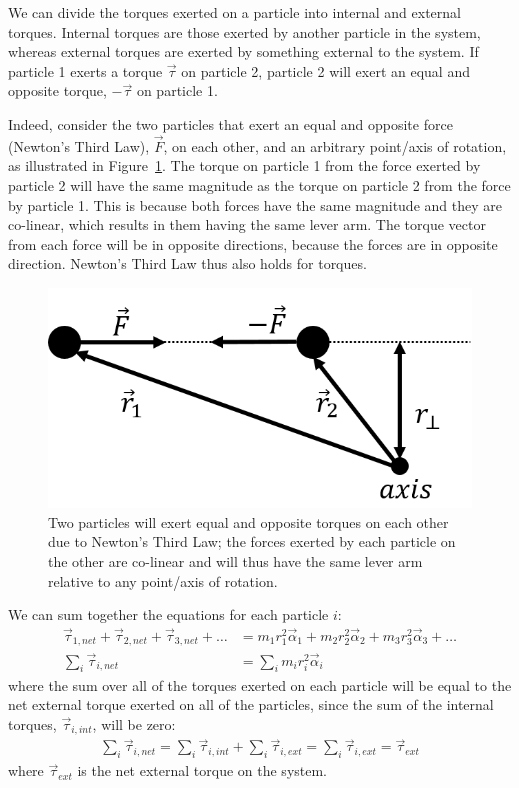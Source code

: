 We can divide the torques exerted on a particle into internal and external torques. Internal torques are those exerted by another particle in the system, whereas external torques are exerted by something external to the system. If particle 1 exerts a torque $\vec\tau$ on particle 2, particle 2 will exert an equal and opposite torque, $-\vec\tau$ on particle 1.

Indeed, consider the two particles that exert an equal and opposite force (Newton's Third Law), $\vec F$, on each other, and an arbitrary point/axis of rotation, as illustrated in Figure~\ref{fig:rotationaldynamics:internaltau}. The torque on particle 1 from the force exerted by particle 2 will have the same magnitude as the torque on particle 2 from the force by particle 1. This is because both forces have the same magnitude and they are co-linear, which results in them having the same lever arm. The torque vector from each force will be in opposite directions, because the forces are in opposite direction. Newton's Third Law thus also holds for torques.

\begin{figure}[!htbp]
\centering
\includegraphics[width=0.375\linewidth]{files/internaltau-7a50341dc6231eb96b051246334dbb8f.png}
\caption[]{Two particles will exert equal and opposite torques on each other due to Newton's Third Law; the forces exerted by each particle on the other are co-linear and will thus have the same lever arm relative to any point/axis of rotation.}
\label{fig:rotationaldynamics:internaltau}
\end{figure}

We can sum together the equations for each particle $i$:
\begin{align*}
\vec\tau_{1,net} + \vec\tau_{2,net} +\vec\tau_{3,net} + \dots &= m_1r_1^2\vec\alpha_1 + m_2r_2^2\vec\alpha_2 +m_3r_3^2\vec\alpha_3 +\dots\\
\sum_i \vec\tau_{i,net} &= \sum_i  m_ir_i^2\vec\alpha_i
\end{align*}
where the sum over all of the torques exerted on each particle will be equal to the net external torque exerted on all of the particles, since the sum of the internal torques, $\vec\tau_{i,int}$, will be zero:
\begin{align*}
\sum_i \vec\tau_{i,net} = \sum_i \vec\tau_{i,int} + \sum_i \vec\tau_{i,ext} = \sum_i \vec\tau_{i,ext} = \vec\tau_{ext}
\end{align*}
where $\vec\tau_{ext}$ is the net external torque on the system.

